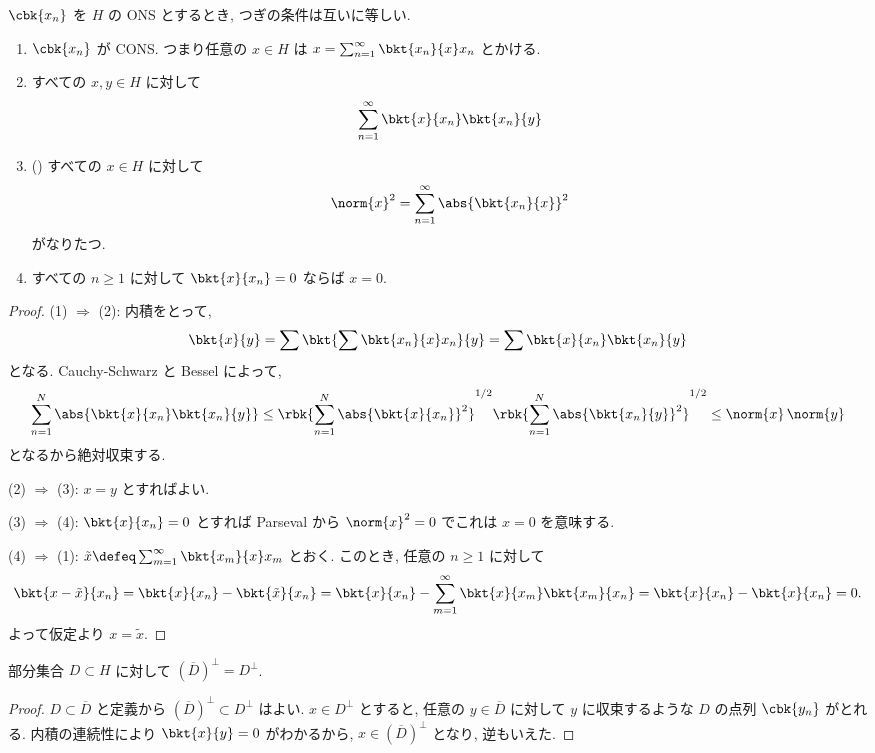 \documentclass[openany, a4paper, oneside]{jsbook}
\begin{document}
\begin{thm}\label{functional_analysis_hilbert_space_yukimi_8}
 $\cbk{x_n}$ を $H$ の ONS とするとき, つぎの条件は互いに等しい.
\begin{enumerate}
\item $\cbk{x_n}$ が CONS.
つまり任意の $x \in H$ は $x = \sum_{n=1}^\infty \bkt{x_n}{x} x_n$ とかける.
\item すべての $x, y \in H$ に対して
\begin{align}
 \sum_{n=1}^\infty \bkt{x}{x_n} \bkt{x_n}{y} \label{functional_analysis_hilbert_space_yukimi_9}
\end{align}
\item () すべての $x \in H$ に対して
\begin{align}
 \norm{x}^2
 =
 \sum_{n = 1}^\infty \abs{\bkt{x_n}{x}}^2
\end{align}
がなりたつ.
\item すべての $n \geq 1$ に対して $\bkt{x}{x_n} = 0$ ならば $x = 0$.
\end{enumerate}
\end{thm}
\begin{proof}
(1) $\Rightarrow$ (2):
内積をとって,
\begin{align}
 \bkt{x}{y}
 =
 \sum \bkt{\sum \bkt{x_n}{x} x_n}{y}
 =
 \sum \bkt{x}{x_n} \bkt{x_n}{y}
\end{align}
となる.
Cauchy-Schwarz と Bessel によって,
\begin{align}
 \sum_{n=1}^N \abs{\bkt{x}{x_n} \bkt{x_n}{y}}
 \leq
 \rbk{\sum_{n=1}^N \abs{\bkt{x}{x_n}}^2}^{1/2}
  \rbk{\sum_{n=1}^N \abs{\bkt{x_n}{y}}^2}^{1/2}
 \leq
 \norm{x} \, \norm{y}
\end{align}
となるから絶対収束する.

(2) $\Rightarrow$ (3):
$x = y$ とすればよい.

(3) $\Rightarrow$ (4):
$\bkt{x}{x_n} = 0$ とすれば Parseval から $\norm{x}^2 = 0$ でこれは $x = 0$ を意味する.

(4) $\Rightarrow$ (1):
$\tilde{x} \defeq \sum_{m = 1}^\infty \bkt{x_m}{x} x_m$ とおく.
このとき, 任意の $n \geq 1$ に対して
\begin{align}
 \bkt{x - \tilde{x}}{x_n}
 =
 \bkt{x}{x_n} - \bkt{\tilde{x}}{x_n}
 =
 \bkt{x}{x_n} - \sum_{m=1}^{\infty} \bkt{x}{x_m} \bkt{x_m}{x_n}
 =
 \bkt{x}{x_n} - \bkt{x}{x_n}
 = 0.
\end{align}
よって仮定より $x = \tilde{x}$.
\end{proof}

\begin{lem}
 部分集合 $D \subset H$ に対して $(\overline{D})^\perp = D^\perp$.
\end{lem}
\begin{proof}
$D \subset \overline{D}$ と定義から $(\overline{D})^\perp \subset D^\perp$ はよい.
$x \in D^\perp$ とすると, 任意の $y \in \overline{D}$ に対して $y$ に収束するような $D$ の点列 $\cbk{y_n}$ がとれる.
内積の連続性により $\bkt{x}{y} = 0$ がわかるから,
$x \in (\overline{D})^\perp$ となり, 逆もいえた.
\end{proof}
\end{document}
